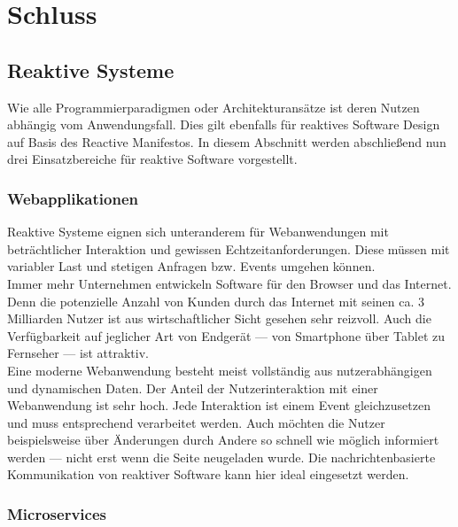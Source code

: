 \chapter{Schluss}
\vspace{-0.5cm}

\section{Reaktive Systeme}
Wie alle Programmierparadigmen oder Architekturansätze ist deren Nutzen abhängig vom Anwendungsfall. Dies gilt ebenfalls für reaktives Software Design auf Basis des Reactive Manifestos. In diesem Abschnitt werden abschließend nun drei Einsatzbereiche für reaktive Software vorgestellt.\\

\vspace{-0.5cm}
\subsection{Webapplikationen}
Reaktive Systeme eignen sich unteranderem für Webanwendungen mit beträchtlicher Interaktion und gewissen Echtzeitanforderungen. Diese müssen mit variabler Last und stetigen Anfragen bzw. Events umgehen können.\\
Immer mehr Unternehmen entwickeln Software für den Browser und das Internet. Denn die potenzielle Anzahl von Kunden durch das Internet mit seinen ca. 3 Milliarden Nutzer ist aus wirtschaftlicher Sicht gesehen sehr reizvoll. Auch die Verfügbarkeit auf jeglicher Art von Endgerät --- von Smartphone über Tablet zu Fernseher --- ist attraktiv.\\
Eine moderne Webanwendung besteht meist vollständig aus nutzerabhängigen und dynamischen Daten. Der Anteil der Nutzerinteraktion mit einer Webanwendung ist sehr hoch. Jede Interaktion ist einem Event gleichzusetzen und muss entsprechend verarbeitet werden. Auch möchten die Nutzer beispielsweise über Änderungen durch Andere so schnell wie möglich informiert werden --- nicht erst wenn die Seite neugeladen wurde. Die nachrichtenbasierte Kommunikation von reaktiver Software kann hier ideal eingesetzt werden.\\

\subsection{Microservices}

